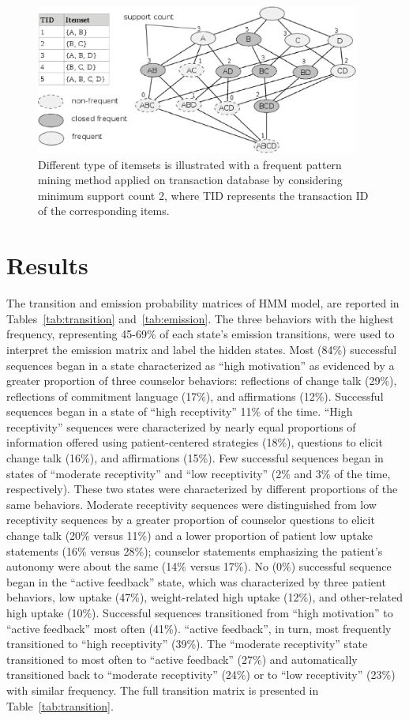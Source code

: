 \begin{figure}
\includegraphics[width=0.95\textwidth]{figures/fpm.eps}
\caption{Different type of itemsets is illustrated with a frequent pattern mining method applied on transaction database by considering minimum support count 2, where TID represents the transaction ID of the corresponding items.}
\label{fig:fpm}
\end{figure}


\section{Results}
\label{sec:results}
The transition and emission probability matrices of HMM model, are reported in Tables~\ref{tab:transition} and~\ref{tab:emission}. The three behaviors with the highest frequency, representing 45-69\% of each state’s emission transitions, were used to interpret the emission matrix and label the hidden states. Most (84\%) successful sequences began in a state characterized as “high motivation” as evidenced by a greater proportion of three counselor behaviors: reflections of change talk (29\%), reflections of commitment language (17\%), and affirmations (12\%). Successful sequences began in a state of “high receptivity” 11\% of the time. “High receptivity” sequences were characterized by nearly equal proportions of information offered using patient-centered strategies (18\%), questions to elicit change talk (16\%), and affirmations (15\%). Few successful sequences began in states of “moderate receptivity” and “low receptivity” (2\% and 3\% of the time, respectively). These two states were characterized by different proportions of the same behaviors. Moderate receptivity sequences were distinguished from low receptivity sequences by a greater proportion of counselor questions to elicit change talk (20\% versus 11\%) and a lower proportion of patient low uptake statements (16\% versus 28\%); counselor statements emphasizing the patient’s autonomy were about the same (14\% versus 17\%). No (0\%) successful sequence began in the “active feedback” state, which was characterized by three patient behaviors, low uptake (47\%), weight-related high uptake (12\%), and other-related high uptake (10\%). Successful sequences transitioned from “high motivation” to “active feedback” most often (41\%). “active feedback”, in turn, most frequently transitioned to “high receptivity” (39\%). The “moderate receptivity” state transitioned to most often to “active feedback” (27\%) and automatically transitioned back to “moderate receptivity” (24\%) or to “low receptivity” (23\%) with similar frequency. The full transition matrix is presented in Table~\ref{tab:transition}.

